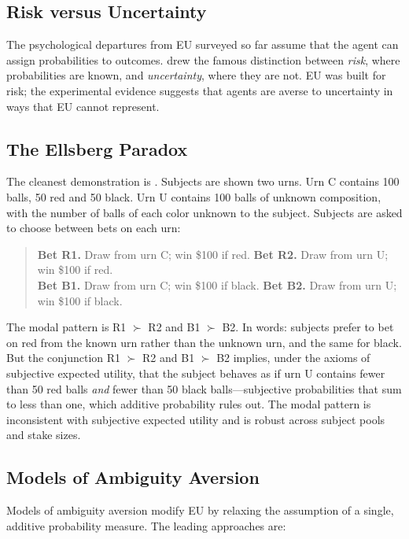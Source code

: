 \subsection{Risk versus Uncertainty}

The psychological departures from EU surveyed so far assume that the agent can assign probabilities to outcomes. \citet{knight1921} drew the famous distinction between \emph{risk}, where probabilities are known, and \emph{uncertainty}, where they are not. EU was built for risk; the experimental evidence suggests that agents are averse to uncertainty in ways that EU cannot represent.

\subsection{The Ellsberg Paradox}

The cleanest demonstration is \citet{ellsberg1961}. Subjects are shown two urns. Urn C contains 100 balls, 50 red and 50 black. Urn U contains 100 balls of unknown composition, with the number of balls of each color unknown to the subject. Subjects are asked to choose between bets on each urn:

\begin{quote}
\textbf{Bet R1.} Draw from urn C; win \$100 if red. \quad
\textbf{Bet R2.} Draw from urn U; win \$100 if red. \\[0.5em]
\textbf{Bet B1.} Draw from urn C; win \$100 if black. \quad
\textbf{Bet B2.} Draw from urn U; win \$100 if black.
\end{quote}

The modal pattern is R1 $\succ$ R2 and B1 $\succ$ B2. In words: subjects prefer to bet on red from the known urn rather than the unknown urn, and the same for black. But the conjunction R1 $\succ$ R2 and B1 $\succ$ B2 implies, under the axioms of subjective expected utility, that the subject behaves as if urn U contains fewer than 50 red balls \emph{and} fewer than 50 black balls---subjective probabilities that sum to less than one, which additive probability rules out. The modal pattern is inconsistent with subjective expected utility and is robust across subject pools and stake sizes.

\subsection{Models of Ambiguity Aversion}

Models of ambiguity aversion modify EU by relaxing the assumption of a single, additive probability measure. The leading approaches are:

